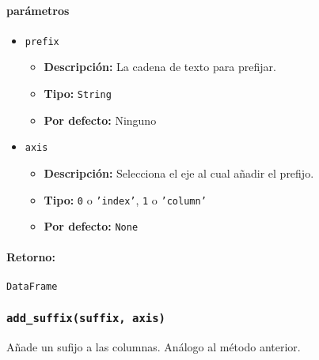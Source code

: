         \paragraph{\textbf{parámetros}}
        \begin{itemize}
            \item \texttt{prefix}
                \begin{itemize}
                    \item \textbf{Descripción:} La cadena de texto para prefijar.
                    \item \textbf{Tipo:} \texttt{String}
                    \item \textbf{Por defecto:} Ninguno
                \end{itemize}
            \item \texttt{axis}
                \begin{itemize}
                    \item \textbf{Descripción:} Selecciona el eje al cual añadir el prefijo.
                    \item \textbf{Tipo:}  \texttt{0} o \texttt{'index'}, \texttt{1} o \texttt{'column'}
                    \item \textbf{Por defecto:} \texttt{None}
                \end{itemize}
        \end{itemize}
        \paragraph{Retorno:} \texttt{DataFrame}


        \subsubsection{\texttt{add\_suffix(suffix, axis)}} Añade un sufijo a las columnas. Análogo al método anterior.
